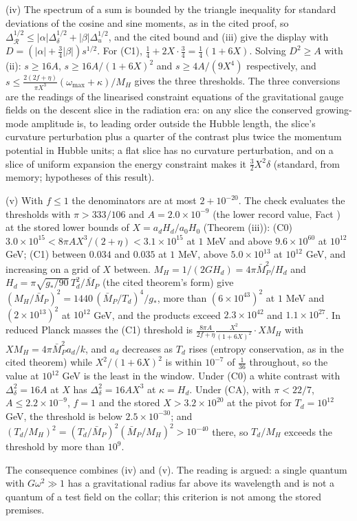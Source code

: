 (iv) The spectrum of a sum is bounded by the triangle inequality for standard deviations of the cosine and sine moments, as in the cited proof, so $\Delta_{\mathcal{R}}^{1/2} \le |\alpha|\Delta_{\delta}^{1/2} + |\beta|\Delta_{u}^{1/2}$, and the cited bound and (iii) give the display with $D = (|\alpha| + \tfrac34|\beta|)s^{1/2}$. For (C1), $\tfrac14 + 2X\cdot\tfrac34 = \tfrac14(1 + 6X)$. Solving $D^{2} \ge A$ with (ii): $s \ge 16A$, $s \ge 16A/(1 + 6X)^{2}$ and $s \ge 4A/(9X^{4})$ respectively, and $s \le \tfrac{2(2f + \eta)}{\pi X^{3}}(\omega_{\max} + \kappa)/M_{H}$ gives the three thresholds. The three conversions are the readings of the linearised constraint equations of the gravitational gauge fields on the descent slice in the radiation era: on any slice the conserved growing-mode amplitude is, to leading order outside the Hubble length, the slice's curvature perturbation plus a quarter of the contrast plus twice the momentum potential in Hubble units; a flat slice has no curvature perturbation, and on a slice of uniform expansion the energy constraint makes it $\tfrac32X^{2}\delta$ (standard, from memory; hypotheses of this result).

(v) With $f \le 1$ the denominators are at most $2 + 10^{-20}$. The check evaluates the thresholds with $\pi > 333/106$ and $A = 2.0 \times 10^{-9}$ (the lower record value, Fact ) at the stored lower bounds of $X = a_{d}H_{d}/a_{0}H_{0}$ (Theorem (iii)): (C0) $3.0 \times 10^{15} < 8\pi AX^{3}/(2 + \eta) < 3.1 \times 10^{15}$ at $1$ MeV and above $9.6 \times 10^{60}$ at $10^{12}$ GeV; (C1) between $0.034$ and $0.035$ at $1$ MeV, above $5.0 \times 10^{13}$ at $10^{12}$ GeV, and increasing on a grid of $X$ between. $M_{H} = 1/(2GH_{d}) = 4\pi\bar M_{P}^{2}/H_{d}$ and $H_{d} = \pi\sqrt{g_{*}/90}\,T_{d}^{2}/\bar M_{P}$ (the cited theorem's form) give $(M_{H}/\bar M_{P})^{2} = 1440\,(\bar M_{P}/T_{d})^{4}/g_{*}$, more than $(6 \times 10^{43})^{2}$ at $1$ MeV and $(2 \times 10^{13})^{2}$ at $10^{12}$ GeV, and the products exceed $2.3 \times 10^{42}$ and $1.1 \times 10^{27}$. In reduced Planck masses the (C1) threshold is $\tfrac{8\pi A}{2f + \eta}\tfrac{X^{2}}{(1 + 6X)^{2}}\cdot XM_{H}$ with $XM_{H} = 4\pi\bar M_{P}^{2}a_{d}/k$, and $a_{d}$ decreases as $T_{d}$ rises (entropy conservation, as in the cited theorem) while $X^{2}/(1 + 6X)^{2}$ is within $10^{-7}$ of $\tfrac{1}{36}$ throughout, so the value at $10^{12}$ GeV is the least in the window. Under (C0) a white contrast with $\Delta_{\delta}^{2} = 16A$ at $X$ has $\Delta_{\delta}^{2} = 16AX^{3}$ at $\kappa = H_{d}$. Under (CA), with $\pi < 22/7$, $A \le 2.2 \times 10^{-9}$, $f = 1$ and the stored $X > 3.2 \times 10^{20}$ at the pivot for $T_{d} = 10^{12}$ GeV, the threshold is below $2.5 \times 10^{-30}$; and $(T_{d}/M_{H})^{2} = (T_{d}/\bar M_{P})^{2}(\bar M_{P}/M_{H})^{2} > 10^{-40}$ there, so $T_{d}/M_{H}$ exceeds the threshold by more than $10^{9}$.

The consequence combines (iv) and (v). The reading is argued: a single quantum with $G\omega^{2} \gg 1$ has a gravitational radius far above its wavelength and is not a quantum of a test field on the collar; this criterion is not among the stored premises.
